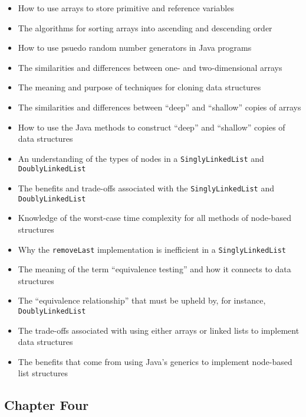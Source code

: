 \documentclass[11pt]{article}
\newcommand{\program}[1]{\lstinline{#1}}
\begin{document}
\begin{itemize}

  \setlength{\itemsep}{0.05in}

  \item How to use arrays to store primitive and reference variables
  \item The algorithms for sorting arrays into ascending and descending order
  \item How to use psuedo random number generators in Java programs
  \item The similarities and differences between one- and two-dimensional arrays
  \item The meaning and purpose of techniques for cloning data structures
  \item The similarities and differences between ``deep'' and ``shallow'' copies
    of arrays
  \item How to use the Java methods to construct ``deep'' and ``shallow'' copies
    of data structures
  \item An understanding of the types of nodes in a \program{SinglyLinkedList} and \program{DoublyLinkedList}
  \item The benefits and trade-offs associated with the \program{SinglyLinkedList} and \program{DoublyLinkedList}
  \item Knowledge of the worst-case time complexity for all methods of node-based structures
  \item Why the \program{removeLast} implementation is inefficient in a \program{SinglyLinkedList}
  \item The meaning of the term ``equivalence testing'' and how it connects to data structures
  \item The ``equivalence relationship'' that must be upheld by, for instance, \program{DoublyLinkedList}
  \item The trade-offs associated with using either arrays or linked lists to implement data structures
  \item The benefits that come from using Java's generics to implement node-based list
    structures

\end{itemize}

\vspace*{-.2in}
\subsection*{Chapter Four}
\end{document}
